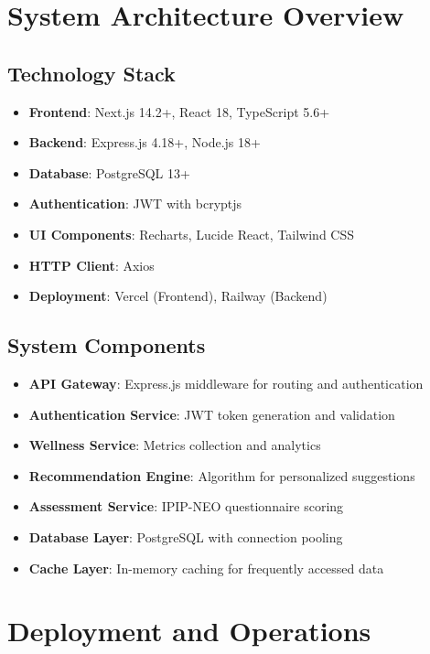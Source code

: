 \documentclass[12pt,a4paper]{article}
\begin{document}
\newpage
\section{System Architecture Overview}

\subsection{Technology Stack}
\begin{itemize}
    \item \textbf{Frontend}: Next.js 14.2+, React 18, TypeScript 5.6+
    \item \textbf{Backend}: Express.js 4.18+, Node.js 18+
    \item \textbf{Database}: PostgreSQL 13+
    \item \textbf{Authentication}: JWT with bcryptjs
    \item \textbf{UI Components}: Recharts, Lucide React, Tailwind CSS
    \item \textbf{HTTP Client}: Axios
    \item \textbf{Deployment}: Vercel (Frontend), Railway (Backend)
\end{itemize}

\subsection{System Components}
\begin{itemize}
    \item \textbf{API Gateway}: Express.js middleware for routing and authentication
    \item \textbf{Authentication Service}: JWT token generation and validation
    \item \textbf{Wellness Service}: Metrics collection and analytics
    \item \textbf{Recommendation Engine}: Algorithm for personalized suggestions
    \item \textbf{Assessment Service}: IPIP-NEO questionnaire scoring
    \item \textbf{Database Layer}: PostgreSQL with connection pooling
    \item \textbf{Cache Layer}: In-memory caching for frequently accessed data
\end{itemize}

\newpage
\section{Deployment and Operations}
\end{document}
